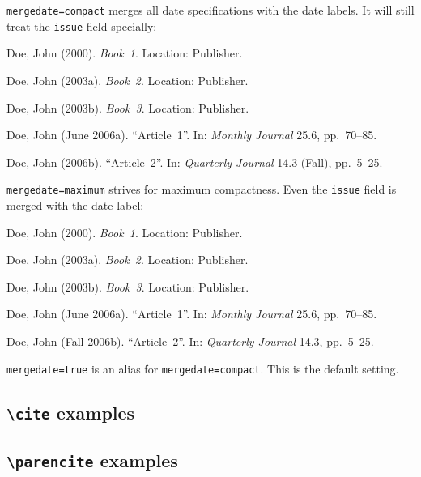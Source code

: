 \documentclass[a4paper]{article}
\newcommand{\cmd}[1]{\texttt{\textbackslash #1}}
\newenvironment{bibsample}
  {\trivlist\samepage
   \setlength{\itemsep}{0pt}}
  {\endtrivlist}
\begin{document}
\texttt{mergedate=compact} merges all date specifications with the
date labels. It will still treat the \texttt{issue} field specially:

\begin{bibsample}
\item Doe, John (2000). \emph{Book~1}. Location: Publisher.
\item Doe, John (2003a). \emph{Book~2}. Location: Publisher.
\item Doe, John (2003b). \emph{Book~3}. Location: Publisher.
\item Doe, John (June 2006a). \enquote{Article~1}. In: \emph{Monthly Journal} 25.6, pp.~70--85.
\item Doe, John (2006b). \enquote{Article~2}. In: \emph{Quarterly Journal} 14.3
(Fall), pp.~5--25.
\end{bibsample}

\texttt{mergedate=maximum} strives for maximum compactness. Even the
\texttt{issue} field is merged with the date label:

\begin{bibsample}
\item Doe, John (2000). \emph{Book~1}. Location: Publisher.
\item Doe, John (2003a). \emph{Book~2}. Location: Publisher.
\item Doe, John (2003b). \emph{Book~3}. Location: Publisher.
\item Doe, John (June 2006a). \enquote{Article~1}. In: \emph{Monthly Journal} 25.6, pp.~70--85.
\item Doe, John (Fall 2006b). \enquote{Article~2}. In: \emph{Quarterly Journal} 14.3, pp.~5--25.
\end{bibsample}

\texttt{mergedate=true} is an alias for \texttt{mergedate=compact}.
This is the default setting.

\subsection*{\cmd{cite} examples}

\cite{companion}

\cite[59]{companion}

\cite[see][]{companion}

\cite[see][59--63]{companion}

\subsection*{\cmd{parencite} examples}
\end{document}
